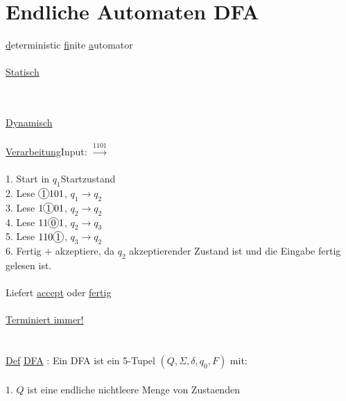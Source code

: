 \documentclass[18pt,a4paper]{scrreprt}
\newcommand*\circled[1]{\tikz[baseline=(char.base)]{
            \node[shape=circle,draw,inner sep=1pt] (char) {#1};}}
\newcommand{\tab}{\hspace*{2em}}
\begin{document}
\section{Endliche Automaten DFA}

\uline{d}eterministic \uline{f}inite \uline{a}utomator\\
\\
\uline{Statisch}\\
\\
\\
\uline{Dynamisch}\\
\\
\uline{Verarbeitung}\tab Input: $\xrightarrow{1101}$\\
\\
1. Start in $q_1$\tab Startzustand\\
2. Lese $\circled{1}101$\tab, $q_1 \rightarrow q_2$\\
3. Lese $1\circled{1}01$\tab, $q_2 \rightarrow q_2$\\
4. Lese $11\circled{0}1$\tab, $q_2 \rightarrow q_3$\\
5. Lese $110\circled{1}$\tab, $q_3 \rightarrow q_2$\\
6. Fertig $+$ akzeptiere, da $q_2$ akzeptierender Zustand ist und die Eingabe fertig gelesen ist.\\
\\
Liefert \uline{accept} oder \uline{fertig}\\
\\
\uline{Terminiert immer!}\\
\\
\\
\uline{Def}  \uline{DFA} : Ein DFA ist ein 5-Tupel $(Q, \Sigma, \delta, q_0, F)$ mit:\\
\\
1. $Q$ ist eine endliche nichtleere Menge von Zustaenden\\
\end{document}
